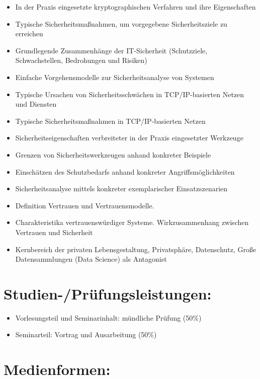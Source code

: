 \begin{itemize}
\tightlist
\item
  In der Praxis eingesetzte kryptographischen Verfahren und ihre
  Eigenschaften
\item
  Typische Sicherheitsmaßnahmen, um vorgegebene Sicherheitsziele zu
  erreichen
\item
  Grundlegende Zusammenhänge der IT-Sicherheit (Schutzziele,
  Schwachstellen, Bedrohungen und Risiken)
\item
  Einfache Vorgehensmodelle zur Sicherheitsanalyse von Systemen
\item
  Typische Ursachen von Sicherheitsschwächen in TCP/IP-basierten Netzen
  und Diensten
\item
  Typische Sicherheitsmaßnahmen in TCP/IP-basierten Netzen
\item
  Sicherheitseigenschaften verbreiteter in der Praxis eingesetzter
  Werkzeuge
\item
  Grenzen von Sicherheitswerkzeugen anhand konkreter Beispiele
\item
  Einschätzen des Schutzbedarfs anhand konkreter Angriffsmöglichkeiten
\item
  Sicherheitsanalyse mittels konkreter exemplarischer Einsatzszenarien
\item
  Definition Vertrauen und Vertrauensmodelle.
\item
  Charakteristika vertrauenswürdiger Systeme. Wirkzusammenhang zwischen
  Vertrauen und Sicherheit
\item
  Kernbereich der privaten Lebensgestaltung, Privatsphäre, Datenschutz,
  Große Datensammlungen (Data Science) als Antagonist
\end{itemize}

\section*{Studien-/Prüfungsleistungen:}\label{studien-pruxfcfungsleistungen-19}

\begin{itemize}
\tightlist
\item
  Vorlesungsteil und Seminarinhalt: mündliche Prüfung (50\%)
\item
  Seminarteil: Vortrag und Ausarbeitung (50\%)
\end{itemize}

\section*{Medienformen:}\label{medienformen-19}

